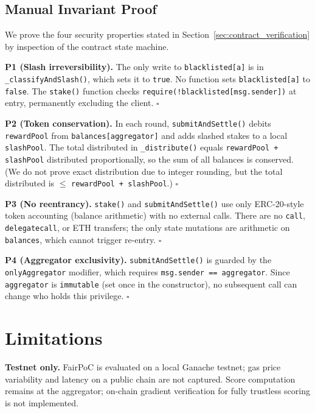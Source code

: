\documentclass[journal]{IEEEtran}
\theoremstyle{definition}
\theoremstyle{remark}
\begin{document}
\subsection{Manual Invariant Proof}

We prove the four security properties stated in
Section~\ref{sec:contract_verification} by inspection of the contract
state machine.

\textbf{P1 (Slash irreversibility).}
The only write to \texttt{blacklisted[a]} is in \texttt{\_classifyAndSlash()},
which sets it to \texttt{true}.
No function sets \texttt{blacklisted[a]} to \texttt{false}.
The \texttt{stake()} function checks \texttt{require(!blacklisted[msg.sender])}
at entry, permanently excluding the client.
\hfill$\square$

\textbf{P2 (Token conservation).}
In each round, \texttt{submitAndSettle()} debits \texttt{rewardPool}
from \texttt{balances[aggregator]} and adds slashed stakes to a local
\texttt{slashPool}.
The total distributed in \texttt{\_distribute()} equals
\texttt{rewardPool + slashPool} distributed proportionally, so the sum
of all balances is conserved.
(We do not prove exact distribution due to integer rounding, but the
total distributed is $\leq$ \texttt{rewardPool + slashPool}.)
\hfill$\square$

\textbf{P3 (No reentrancy).}
\texttt{stake()} and \texttt{submitAndSettle()} use only ERC-20-style
token accounting (balance arithmetic) with no external calls.
There are no \texttt{call}, \texttt{delegatecall}, or ETH transfers;
the only state mutations are arithmetic on \texttt{balances}, which
cannot trigger re-entry.
\hfill$\square$

\textbf{P4 (Aggregator exclusivity).}
\texttt{submitAndSettle()} is guarded by the \texttt{onlyAggregator}
modifier, which requires \texttt{msg.sender == aggregator}.
Since \texttt{aggregator} is \texttt{immutable} (set once in the
constructor), no subsequent call can change who holds this privilege.
\hfill$\square$

\section{Limitations}
\label{sec:limitations}

\textbf{Testnet only.}
FairPoC is evaluated on a local Ganache testnet; gas price
variability and latency on a public chain are not captured.
Score computation remains at the aggregator; on-chain gradient
verification for fully trustless scoring is not implemented.
\end{document}
